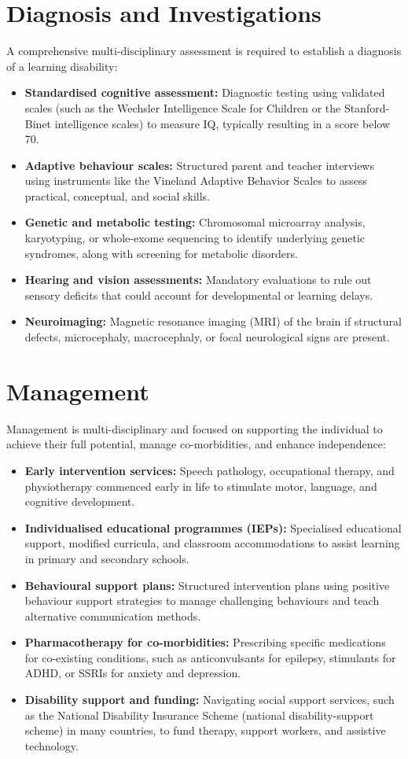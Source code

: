 \section*{Diagnosis and Investigations}
A comprehensive multi-disciplinary assessment is required to establish a diagnosis of a learning disability:
\begin{itemize}
    \item \textbf{Standardised cognitive assessment:} Diagnostic testing using validated scales (such as the Wechsler Intelligence Scale for Children or the Stanford-Binet intelligence scales) to measure IQ, typically resulting in a score below 70.
    \item \textbf{Adaptive behaviour scales:} Structured parent and teacher interviews using instruments like the Vineland Adaptive Behavior Scales to assess practical, conceptual, and social skills.
    \item \textbf{Genetic and metabolic testing:} Chromosomal microarray analysis, karyotyping, or whole-exome sequencing to identify underlying genetic syndromes, along with screening for metabolic disorders.
    \item \textbf{Hearing and vision assessments:} Mandatory evaluations to rule out sensory deficits that could account for developmental or learning delays.
    \item \textbf{Neuroimaging:} Magnetic resonance imaging (MRI) of the brain if structural defects, microcephaly, macrocephaly, or focal neurological signs are present.
\end{itemize}

\section*{Management}
Management is multi-disciplinary and focused on supporting the individual to achieve their full potential, manage co-morbidities, and enhance independence:
\begin{itemize}
    \item \textbf{Early intervention services:} Speech pathology, occupational therapy, and physiotherapy commenced early in life to stimulate motor, language, and cognitive development.
    \item \textbf{Individualised educational programmes (IEPs):} Specialised educational support, modified curricula, and classroom accommodations to assist learning in primary and secondary schools.
    \item \textbf{Behavioural support plans:} Structured intervention plans using positive behaviour support strategies to manage challenging behaviours and teach alternative communication methods.
    \item \textbf{Pharmacotherapy for co-morbidities:} Prescribing specific medications for co-existing conditions, such as anticonvulsants for epilepsy, stimulants for ADHD, or SSRIs for anxiety and depression.
    \item \textbf{Disability support and funding:} Navigating social support services, such as the National Disability Insurance Scheme (national disability-support scheme) in many countries, to fund therapy, support workers, and assistive technology.
\end{itemize}

